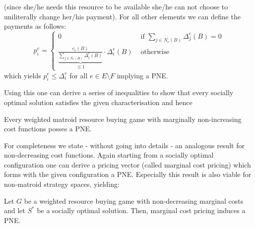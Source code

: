 \documentclass{scrartcl}
\theoremstyle{nonumberplain}
\begin{document}
(since she/he needs this resource to be available she/he can not choose to
uniliterally change her/his payment). For all other elements we can define the
payments as follows:
\begin{equation*}
  p_{i}^{e} = \begin{cases}
    0 &\text{ if } \sum_{j\in N_{e}(B)}\Delta_{j}^{e}(B) = 0\\
    \underbrace{
      \frac{c_{e}(B)}{\sum_{j\in N_{e}(B)}\Delta_{j}^{e}(B)}
    }_{\leq 1}\cdot\Delta_{i}^{e}(B) &\text{ otherwise}
  \end{cases}
\end{equation*}
which yields $p_{i}^{e}\leq \Delta_{i}^{e}$ for all $e\in E\setminus F$
implying a PNE.

Using this one can derive a series of inequalities to show that every socially
optimal solution satisfies the given characterisation and hence
\begin{theo}
  Every weighted matroid resource buying game with marginally non-increasing
  cost functions posses a PNE.
\end{theo}
For completeness we state - without going into details - an analogous result
for non-decreasing cost functions. Again starting from a socially optimal
configuration one can derive a pricing vector (called marginal cost pricing)
which forms with the given configuration a PNE. Especially this result is
also viable for non-matroid strategy spaces, yielding:
\begin{theo}
  Let $G$ be a weighted resource buying game with non-decreasing marginal costs
  and let $S^{\ast}$ be a socially optimal solution. Then, marginal cost
  pricing induces a PNE.
\end{theo}
\end{document}
